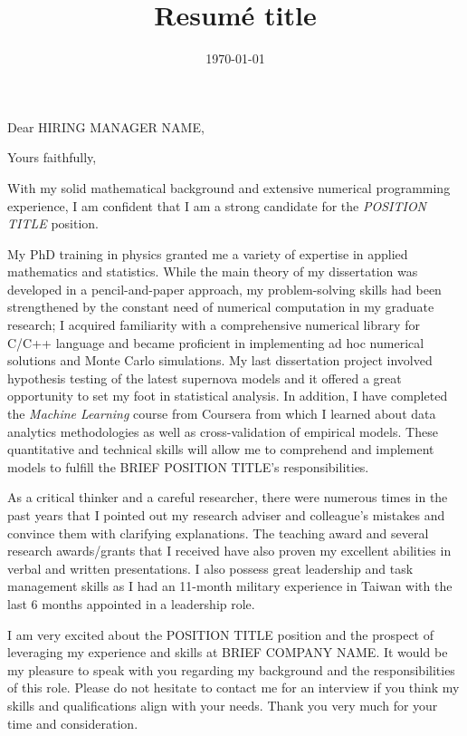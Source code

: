 \documentclass[11pt,a4paper,roman]{moderncv}
\title{Resumé title}
\begin{document}
\date{\today}

\opening{Dear HIRING MANAGER NAME,}
\closing{Yours faithfully,}
\makelettertitle
\justify

With my solid mathematical background and extensive numerical programming experience, I am confident that I am a strong candidate for the
\textit{POSITION TITLE}
position.


My PhD training in physics granted me a variety of expertise in applied mathematics and statistics. While the main theory of my dissertation was developed in a pencil-and-paper approach, my problem-solving skills had been strengthened by the constant need of numerical computation in my graduate research; I acquired familiarity with a comprehensive numerical library for C/C++ language and became proficient in implementing ad hoc numerical solutions and Monte Carlo simulations. My last dissertation project involved hypothesis testing of the latest supernova models and it offered a great opportunity to set my foot in statistical analysis. In addition, I have completed the \textit{Machine Learning} course from Coursera from which I learned about data analytics methodologies as well as cross-validation of empirical models. These quantitative and technical skills will allow me to comprehend and implement models to fulfill the
BRIEF POSITION TITLE's
responsibilities.  

As a critical thinker and a careful researcher, there were numerous times in the past years that I pointed out my research adviser and colleague's mistakes and convince them with clarifying explanations. The teaching award and several research awards/grants that I received have also proven my excellent abilities in verbal and written presentations. I also possess great leadership and task management skills as I had an 11-month military experience in Taiwan with the last 6 months appointed in a leadership role. 

I am very excited about the
POSITION TITLE
position and the prospect of leveraging my experience and skills
at BRIEF COMPANY NAME.
It would be my pleasure to speak with you regarding my background and the responsibilities of this role. Please do not hesitate to contact me for an interview if you think my skills and qualifications align with your needs. Thank you very much for your time and consideration.

\makeletterclosing
\end{document}
